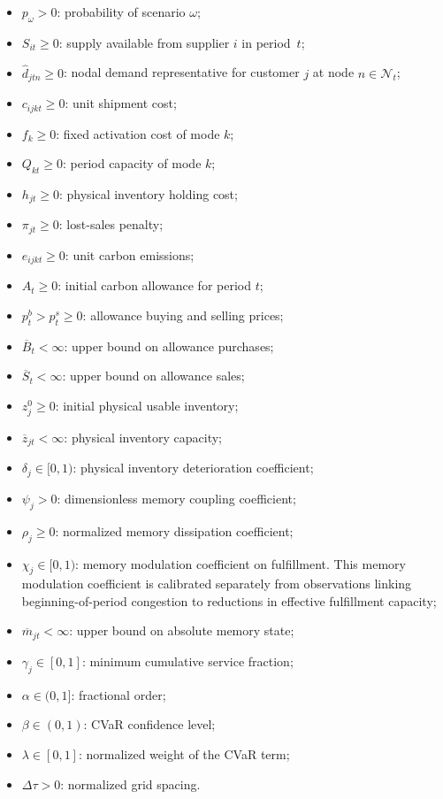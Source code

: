 \documentclass[11pt,a4paper]{article}
\begin{document}
\begin{itemize}
  \item \(p_\omega>0\): probability of scenario \(\omega\);
  \item \(S_{it}\geq0\): supply available from supplier \(i\) in
  period~\(t\);
  \item \(\widehat{d}_{jtn}\geq0\): nodal demand representative for
  customer \(j\) at node \(n\in\mathcal{N}_t\);
  \item \(c_{ijkt}\geq0\): unit shipment cost;
  \item \(f_k\geq0\): fixed activation cost of mode \(k\);
  \item \(Q_{kt}\geq0\): period capacity of mode \(k\);
  \item \(h_{jt}\geq0\): physical inventory holding cost;
  \item \(\pi_{jt}\geq0\): lost-sales penalty;
  \item \(e_{ijkt}\geq0\): unit carbon emissions;
  \item \(A_t\geq0\): initial carbon allowance for period \(t\);
  \item \(p_t^b>p_t^s\geq0\): allowance buying and selling prices;
  \item \(\overline B_t<\infty\): upper bound on allowance purchases;
  \item \(\overline S_t<\infty\): upper bound on allowance sales;
  \item \(z_j^0\geq0\): initial physical usable inventory;
  \item \(\overline z_{jt}<\infty\): physical inventory capacity;
  \item \(\delta_j\in[0,1)\): physical inventory deterioration
  coefficient;
  \item \(\psi_j>0\): dimensionless memory coupling coefficient;
  \item \(\rho_j\geq0\): normalized memory dissipation coefficient;
  \item \(\chi_j \in [0,1)\): memory modulation coefficient on
  fulfillment. This memory modulation coefficient is calibrated separately from observations linking beginning-of-period congestion to reductions in effective fulfillment capacity;
  \item \(\overline m_{jt}<\infty\): upper bound on absolute memory
  state;
  \item \(\gamma_j\in[0,1]\): minimum cumulative service fraction;
  \item \(\alpha\in(0,1]\): fractional order;
  \item \(\beta\in(0,1)\): CVaR confidence level;
  \item \(\lambda\in[0,1]\): normalized weight of the CVaR term;
  \item \(\Delta\tau>0\): normalized grid spacing.
\end{itemize}
\end{document}
